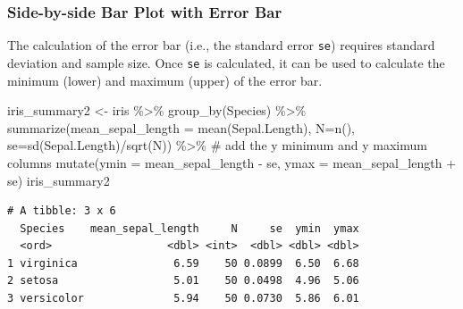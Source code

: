 \documentclass[
  letterpaper,
  DIV=11,
  numbers=noendperiod]{scrreprt}
\newenvironment{Shaded}{\begin{snugshade}}{\end{snugshade}}
\newcommand{\AttributeTok}[1]{\textcolor[rgb]{0.40,0.45,0.13}{#1}}
\newcommand{\CommentTok}[1]{\textcolor[rgb]{0.37,0.37,0.37}{#1}}
\newcommand{\FunctionTok}[1]{\textcolor[rgb]{0.28,0.35,0.67}{#1}}
\newcommand{\NormalTok}[1]{\textcolor[rgb]{0.00,0.23,0.31}{#1}}
\newcommand{\OtherTok}[1]{\textcolor[rgb]{0.00,0.23,0.31}{#1}}
\newcommand{\SpecialCharTok}[1]{\textcolor[rgb]{0.37,0.37,0.37}{#1}}
\begin{document}
\subsubsection{Side-by-side Bar Plot with Error
Bar}\label{sec-ggplot-error-bar}

The calculation of the error bar (i.e., the standard error \texttt{se})
requires standard deviation and sample size. Once \texttt{se} is
calculated, it can be used to calculate the minimum (lower) and maximum
(upper) of the error bar.

\begin{Shaded}
\begin{Highlighting}[]
\NormalTok{iris\_summary2 }\OtherTok{\textless{}{-}}\NormalTok{ iris }\SpecialCharTok{\%\textgreater{}\%}
                  \FunctionTok{group\_by}\NormalTok{(Species) }\SpecialCharTok{\%\textgreater{}\%}
                  \FunctionTok{summarize}\NormalTok{(}\AttributeTok{mean\_sepal\_length =} \FunctionTok{mean}\NormalTok{(Sepal.Length),}
                            \AttributeTok{N=}\FunctionTok{n}\NormalTok{(),}
                            \AttributeTok{se=}\FunctionTok{sd}\NormalTok{(Sepal.Length)}\SpecialCharTok{/}\FunctionTok{sqrt}\NormalTok{(N)) }\SpecialCharTok{\%\textgreater{}\%}
                  \CommentTok{\# add the y minimum and y maximum columns}
                  \FunctionTok{mutate}\NormalTok{(}\AttributeTok{ymin =}\NormalTok{ mean\_sepal\_length }\SpecialCharTok{{-}}\NormalTok{ se,}
                         \AttributeTok{ymax =}\NormalTok{ mean\_sepal\_length }\SpecialCharTok{+}\NormalTok{ se)}
\NormalTok{iris\_summary2}
\end{Highlighting}
\end{Shaded}

\begin{verbatim}
# A tibble: 3 x 6
  Species    mean_sepal_length     N     se  ymin  ymax
  <ord>                  <dbl> <int>  <dbl> <dbl> <dbl>
1 virginica               6.59    50 0.0899  6.50  6.68
2 setosa                  5.01    50 0.0498  4.96  5.06
3 versicolor              5.94    50 0.0730  5.86  6.01
\end{verbatim}
\end{document}
